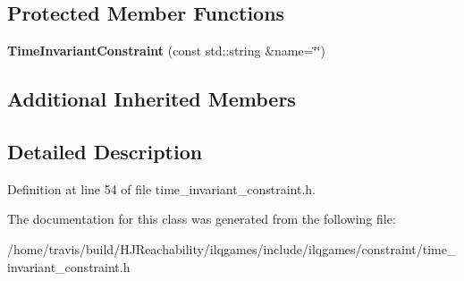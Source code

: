 \subsection*{Protected Member Functions}
\begin{DoxyCompactItemize}
\item 
{\bfseries Time\+Invariant\+Constraint} (const std\+::string \&name=\char`\"{}\char`\"{})\hypertarget{classilqgames_1_1_time_invariant_constraint_a3e98eea0993ef95728ca804617b52d41}{}\label{classilqgames_1_1_time_invariant_constraint_a3e98eea0993ef95728ca804617b52d41}

\end{DoxyCompactItemize}
\subsection*{Additional Inherited Members}


\subsection{Detailed Description}


Definition at line 54 of file time\+\_\+invariant\+\_\+constraint.\+h.



The documentation for this class was generated from the following file\+:\begin{DoxyCompactItemize}
\item 
/home/travis/build/\+H\+J\+Reachability/ilqgames/include/ilqgames/constraint/time\+\_\+invariant\+\_\+constraint.\+h\end{DoxyCompactItemize}
